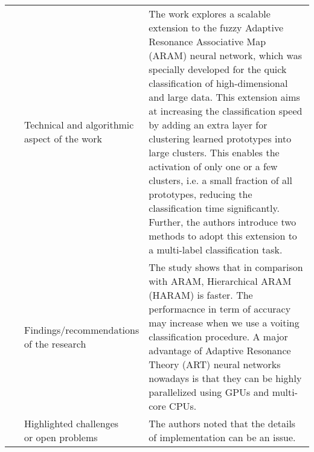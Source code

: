 \begin{landscape}
\begin{longtable}{lp{}p{}}
	\multirow{3}[0]{*}{~\citep{Benites2017}} & 
    \specialcell{Technical and algorithmic \\ aspect of the work} &
    The work explores a scalable extension to the fuzzy Adaptive Resonance Associative Map (ARAM) neural network, which was specially developed for the quick classification of high-dimensional and large data. This extension aims at increasing the classification speed by adding an extra layer for clustering learned prototypes into large clusters. This enables the activation of only one or a few clusters, i.e. a small fraction of all prototypes, reducing the classification time significantly. Further, the authors introduce two methods to adopt this extension to a multi-label classification task.   
    \\ & 
    \specialcell{Findings/recommendations \\ of the research} & 
	The study shows that in comparison with ARAM, Hierarchical ARAM (HARAM) is faster. The performacnce in term of accuracy may increase when we use a voiting classification procedure. A major advantage of Adaptive Resonance Theory (ART) neural networks nowadays is that they can be highly parallelized using GPUs and multi-core CPUs.
    \\ & 
    \specialcell{Highlighted challenges \\ or open problems} & 
	The authors noted that the details of implementation can be an issue.
	\\
	

\end{longtable}
\end{landscape}
